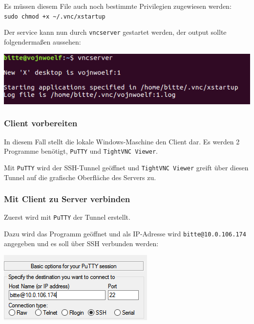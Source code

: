 Es müssen diesem File auch noch bestimmte Privilegien zugewiesen werden: \\\verb|sudo chmod +x ~/.vnc/xstartup|

Der service kann nun durch \verb|vncserver| gestartet werden, der output sollte folgendermaßen aussehen:

\begin{minipage}{\linewidth}
	\centering
	\includegraphics[width=0.8\linewidth]{images/start_service}
\end{minipage}

\subsubsection{Client vorbereiten}
In diesem Fall stellt die lokale Windows-Maschine den Client dar. Es werden 2 Programme benötigt, \verb|PuTTY| und \verb|TightVNC Viewer|.

Mit \verb|PuTTY| wird der SSH-Tunnel geöffnet und \verb|TightVNC Viewer| greift über diesen Tunnel auf die grafische Oberfläche des Servers zu.

\subsubsection{Mit Client zu Server verbinden}
Zuerst wird mit \verb|PuTTY| der Tunnel erstellt.

Dazu wird das Programm geöffnet und als IP-Adresse wird \verb|bitte@10.0.106.174| angegeben und es soll über SSH verbunden werden:

\begin{minipage}{\linewidth}
	\centering
	\includegraphics[width=0.8\linewidth]{images/user_ip}
\end{minipage}

